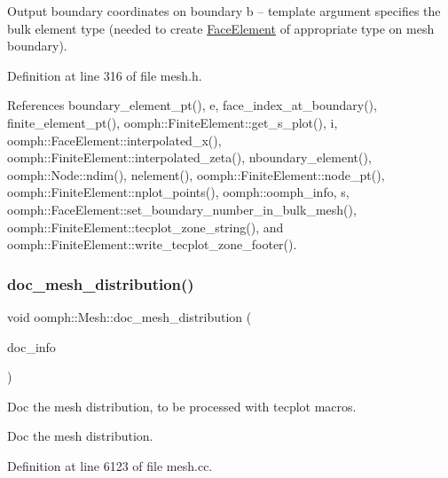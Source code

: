 Output boundary coordinates on boundary b -- template argument specifies the bulk element type (needed to create \hyperlink{classoomph_1_1FaceElement}{Face\+Element} of appropriate type on mesh boundary). 



Definition at line 316 of file mesh.\+h.



References boundary\+\_\+element\+\_\+pt(), e, face\+\_\+index\+\_\+at\+\_\+boundary(), finite\+\_\+element\+\_\+pt(), oomph\+::\+Finite\+Element\+::get\+\_\+s\+\_\+plot(), i, oomph\+::\+Face\+Element\+::interpolated\+\_\+x(), oomph\+::\+Finite\+Element\+::interpolated\+\_\+zeta(), nboundary\+\_\+element(), oomph\+::\+Node\+::ndim(), nelement(), oomph\+::\+Finite\+Element\+::node\+\_\+pt(), oomph\+::\+Finite\+Element\+::nplot\+\_\+points(), oomph\+::oomph\+\_\+info, s, oomph\+::\+Face\+Element\+::set\+\_\+boundary\+\_\+number\+\_\+in\+\_\+bulk\+\_\+mesh(), oomph\+::\+Finite\+Element\+::tecplot\+\_\+zone\+\_\+string(), and oomph\+::\+Finite\+Element\+::write\+\_\+tecplot\+\_\+zone\+\_\+footer().

\mbox{\label{classoomph_1_1Mesh_ac709c75770886514e2d38c2c7cb74f72}} 
\subsubsection{\texorpdfstring{doc\+\_\+mesh\+\_\+distribution()}{doc\_mesh\_distribution()}}
{\footnotesize\ttfamily void oomph\+::\+Mesh\+::doc\+\_\+mesh\+\_\+distribution (\begin{DoxyParamCaption}\item[{\hyperlink{classoomph_1_1DocInfo}{Doc\+Info} \&}]{doc\+\_\+info }\end{DoxyParamCaption})}



Doc the mesh distribution, to be processed with tecplot macros. 

Doc the mesh distribution. 

Definition at line 6123 of file mesh.\+cc.



